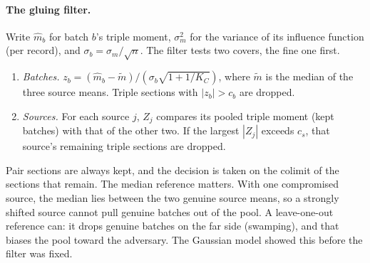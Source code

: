 \documentclass[11pt]{article}
\theoremstyle{definition}\newtheorem{definition}{Definition}\newtheorem{remark}{Remark}
\begin{document}
\paragraph{The gluing filter.} Write $\hat m_b$ for batch $b$'s triple moment, $\sigma_m^2$ for the variance of its influence function
(per record), and $\sigma_b=\sigma_m/\sqrt n$. The filter tests two covers, the fine one first.
\begin{enumerate}
\item \emph{Batches.} $z_b=(\hat m_b-\tilde m)/(\sigma_b\sqrt{1+1/K_C})$, where $\tilde m$ is the median of the three source means.
  Triple sections with $|z_b|>c_b$ are dropped.
\item \emph{Sources.} For each source $j$, $Z_j$ compares its pooled triple moment (kept batches) with that of the other two. If the
  largest $|Z_j|$ exceeds $c_s$, that source's remaining triple sections are dropped.
\end{enumerate}
Pair sections are always kept, and the decision is taken on the colimit of the sections that remain. The median reference matters.
With one compromised source, the median lies between the two genuine source means, so a strongly shifted source cannot pull genuine
batches out of the pool. A leave-one-out reference can: it drops genuine batches on the far side (swamping), and that biases the pool
toward the adversary. The Gaussian model showed this before the filter was fixed.
\end{document}
